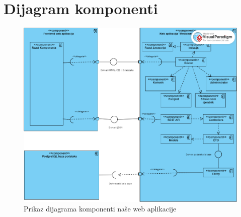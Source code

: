 			\eject
		\section{Dijagram komponenti}
		
			\begin{figure}[H]
				\includegraphics[scale=0.52]{slike/DijagramKomponenti.PNG} %
				\centering
				\caption{Prikaz dijagrama komponenti naše web aplikacije}
				\label{fig:promjene}
			\end{figure}